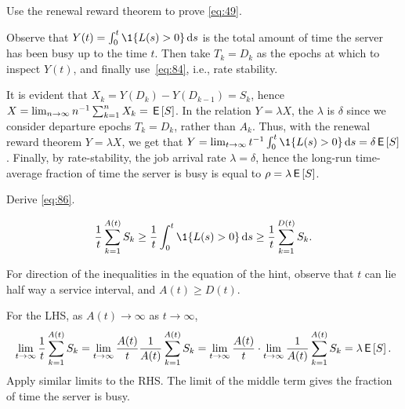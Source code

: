 \begin{exercise}\label{ex:l-162}
Use the renewal reward theorem to prove \cref{eq:49}.
\begin{hint}
 Observe that $Y(t) = \int_0^t \1{\L(s)>0} \d s$ is the total amount of time the server has been busy up to the time $t$. 
 Then take  $T_k = D_k$ as the epochs at which to inspect $Y(t)$, and finally use~\cref{eq:84}, i.e., rate stability.
\end{hint}
\begin{solution}
 It is evident that $X_k = Y(D_k)-Y(D_{k-1})=S_k$, hence $X = \lim_{n\to\infty} n^{-1}\sum_{k=1}^n X_k = \,\mathsf{E}\left[S\right]$.
 In the relation $Y = \lambda X$, the $\lambda$ is $\delta$ since we consider departure epochs $T_k = D_k$, rather than $A_k$.
 Thus, with the renewal reward theorem $Y=\lambda X$, we get that $Y = \lim_{t\to\infty} t^{-1} \int_0^t \1{\L(s)>0} \d s = \delta \E S$.
 Finally, by rate-stability, the job arrival rate $\lambda = \delta$, hence the long-run time-average fraction of time the server is busy is equal to $\rho = \lambda \,\mathsf{E}\left[S\right]$.
\end{solution}
\end{exercise}


\begin{exercise}\label{ex:70}
Derive \cref{eq:86}.
\begin{hint}
\begin{equation*}
\frac{1}{t} \sum_{k=1}^{A(t)} S_k \geq \frac{1}{t}  \int_0^t \1{\L(s)>0} \d s \geq \frac{1}{t}  \sum_{k=1}^{D(t)} S_k.
\end{equation*}
\end{hint}
\begin{solution}
  For direction of the inequalities in the equation of the hint, observe that $t$ can lie half way a service interval, and $A(t) \geq D(t)$.

  For the LHS, as $A(t)\to \infty$ as $t\to\infty$,
\begin{equation*}
 \lim_{t\to\infty} \frac 1 t\sum_{k=1}^{A(t)} S_k = 
 \lim_{t\to\infty} \frac{A(t)}t \frac{1}{A(t)} \sum_{k=1}^{A(t)} S_k = 
 \lim_{t\to\infty} \frac{A(t)}t \cdot \lim_{t\to\infty}\frac{1}{A(t)} \sum_{k=1}^{A(t)} S_k = \lambda \,\mathsf{E}\left[S\right].
\end{equation*}
Apply similar limits to the RHS.
The limit of the middle term gives the fraction of time the server is busy.
\end{solution}
\end{exercise}





